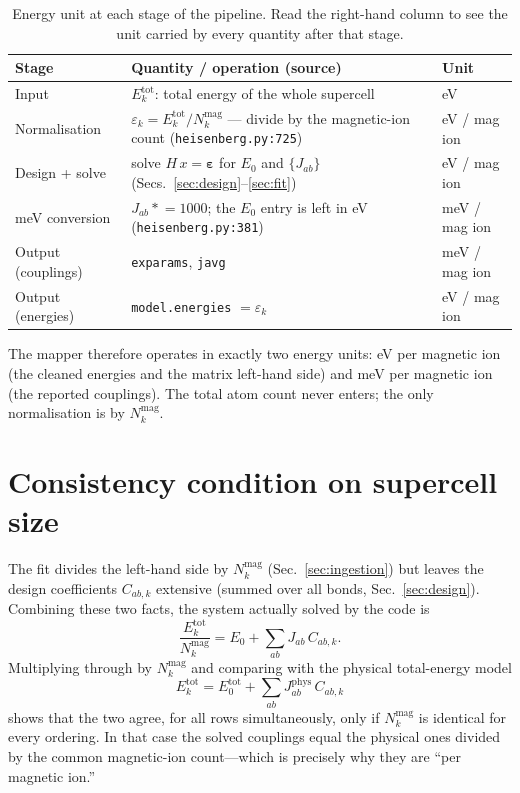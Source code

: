 \documentclass[11pt]{article}
\newcommand{\code}[1]{\texttt{\def\_{\textunderscore\allowbreak}#1}}
\begin{document}
\begin{table}[h]
\centering
\caption{Energy unit at each stage of the pipeline. Read the right-hand column to
see the unit carried by every quantity after that stage.}
\label{tab:units}
\begin{tabularx}{\textwidth}{@{}l X l@{}}
\toprule
Stage & Quantity / operation (source) & Unit \\
\midrule
Input
  & $E_k^{\mathrm{tot}}$: total energy of the whole supercell
  & eV \\
\addlinespace
Normalisation
  & $\varepsilon_k = E_k^{\mathrm{tot}} / N_k^{\mathrm{mag}}$ --- divide by the
    magnetic-ion count (\code{heisenberg.py:725})
  & eV / mag ion \\
\addlinespace
Design + solve
  & solve $H\,x = \boldsymbol{\varepsilon}$ for $E_0$ and $\{J_{ab}\}$
    (Secs.~\ref{sec:design}--\ref{sec:fit})
  & eV / mag ion \\
\addlinespace
meV conversion
  & $J_{ab} \mathrel{*}= 1000$; the $E_0$ entry is left in eV
    (\code{heisenberg.py:381})
  & meV / mag ion \\
\midrule
Output (couplings)
  & \code{ex\_params}, \code{javg}
  & meV / mag ion \\
Output (energies)
  & \code{model.energies} $= \varepsilon_k$
  & eV / mag ion \\
\bottomrule
\end{tabularx}
\end{table}

The mapper therefore operates in exactly two energy units: eV per magnetic ion
(the cleaned energies and the matrix left-hand side) and meV per magnetic ion
(the reported couplings). The total atom count never enters; the only
normalisation is by $N_k^{\mathrm{mag}}$.

\section{Consistency condition on supercell size}
\label{sec:consistency}

The fit divides the left-hand side by $N_k^{\mathrm{mag}}$
(Sec.~\ref{sec:ingestion}) but leaves the design coefficients $C_{ab,k}$
extensive (summed over all bonds, Sec.~\ref{sec:design}). Combining these two
facts, the system actually solved by the code is
\begin{equation}
  \frac{E_k^{\mathrm{tot}}}{N_k^{\mathrm{mag}}}
  = E_0 + \sum_{ab} J_{ab}\, C_{ab,k} .
\end{equation}
Multiplying through by $N_k^{\mathrm{mag}}$ and comparing with the physical
total-energy model
\begin{equation}
  E_k^{\mathrm{tot}} = E_0^{\mathrm{tot}} + \sum_{ab} J_{ab}^{\mathrm{phys}}\, C_{ab,k}
\end{equation}
shows that the two agree, for all rows simultaneously, only if
$N_k^{\mathrm{mag}}$ is identical for every ordering. In that case the solved
couplings equal the physical ones divided by the common magnetic-ion count---which
is precisely why they are ``per magnetic ion.''
\end{document}
